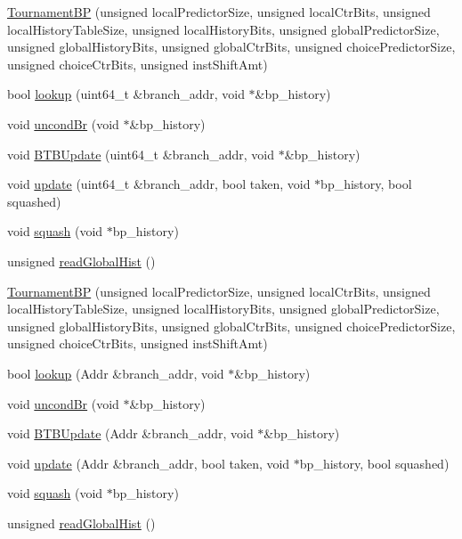 \begin{DoxyCompactItemize}
\item 
\hyperlink{classTournamentBP_a139b9b75152644b3b9359290140458a0}{TournamentBP} (unsigned localPredictorSize, unsigned localCtrBits, unsigned localHistoryTableSize, unsigned localHistoryBits, unsigned globalPredictorSize, unsigned globalHistoryBits, unsigned globalCtrBits, unsigned choicePredictorSize, unsigned choiceCtrBits, unsigned instShiftAmt)
\item 
bool \hyperlink{classTournamentBP_a458ef4efb74ebe35efed4ea8933097db}{lookup} (uint64\_\-t \&branch\_\-addr, void $\ast$\&bp\_\-history)
\item 
void \hyperlink{classTournamentBP_a7326c97464700d2ade3996ccf0d8d4b4}{uncondBr} (void $\ast$\&bp\_\-history)
\item 
void \hyperlink{classTournamentBP_a6574e8378e0e4b8dddb438d5d35e9c16}{BTBUpdate} (uint64\_\-t \&branch\_\-addr, void $\ast$\&bp\_\-history)
\item 
void \hyperlink{classTournamentBP_a799799c18338ad678eb26519fb1dc80e}{update} (uint64\_\-t \&branch\_\-addr, bool taken, void $\ast$bp\_\-history, bool squashed)
\item 
void \hyperlink{classTournamentBP_acf02d96a4a353442c055d3109e1bf1d2}{squash} (void $\ast$bp\_\-history)
\item 
unsigned \hyperlink{classTournamentBP_a09794f569c803909afa2677e16b993f4}{readGlobalHist} ()
\item 
\hyperlink{classTournamentBP_a139b9b75152644b3b9359290140458a0}{TournamentBP} (unsigned localPredictorSize, unsigned localCtrBits, unsigned localHistoryTableSize, unsigned localHistoryBits, unsigned globalPredictorSize, unsigned globalHistoryBits, unsigned globalCtrBits, unsigned choicePredictorSize, unsigned choiceCtrBits, unsigned instShiftAmt)
\item 
bool \hyperlink{classTournamentBP_a493edbed2253cdfcda936f4dcda80df0}{lookup} (Addr \&branch\_\-addr, void $\ast$\&bp\_\-history)
\item 
void \hyperlink{classTournamentBP_a7326c97464700d2ade3996ccf0d8d4b4}{uncondBr} (void $\ast$\&bp\_\-history)
\item 
void \hyperlink{classTournamentBP_a58d163a5d49b0c7313dbaffd3738283e}{BTBUpdate} (Addr \&branch\_\-addr, void $\ast$\&bp\_\-history)
\item 
void \hyperlink{classTournamentBP_a3c4515cdaf3778811b03b74bf381a3f8}{update} (Addr \&branch\_\-addr, bool taken, void $\ast$bp\_\-history, bool squashed)
\item 
void \hyperlink{classTournamentBP_acf02d96a4a353442c055d3109e1bf1d2}{squash} (void $\ast$bp\_\-history)
\item 
unsigned \hyperlink{classTournamentBP_a09794f569c803909afa2677e16b993f4}{readGlobalHist} ()
\end{DoxyCompactItemize}


